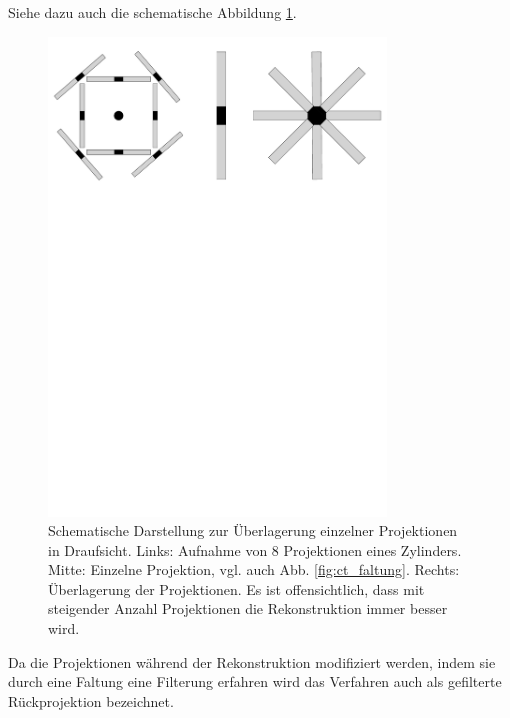 \documentclass[11pt, a4paper]{article}
\numberwithin{equation}{section}
\begin{document}
\begin{enumerate}
	Siehe dazu auch die schematische Abbildung \ref{fig:ct_überlagerung}.
	\begin{figure}[ht]
		\centering
		\includegraphics[width=0.8\textwidth]{./figures/ct/ueberlagerung.pdf}
		\caption{Schematische Darstellung zur Überlagerung einzelner Projektionen in Draufsicht. Links: Aufnahme von 8 Projektionen eines Zylinders. Mitte: Einzelne Projektion, vgl. auch Abb. \ref{fig:ct_faltung}. Rechts: Überlagerung der Projektionen. Es ist offensichtlich, dass mit steigender Anzahl Projektionen die Rekonstruktion immer besser wird.}
		\label{fig:ct_überlagerung}
	\end{figure}
\end{enumerate}
Da die Projektionen während der Rekonstruktion modifiziert werden, indem sie durch eine Faltung eine Filterung erfahren wird das Verfahren auch als gefilterte Rückprojektion bezeichnet.
\end{document}

